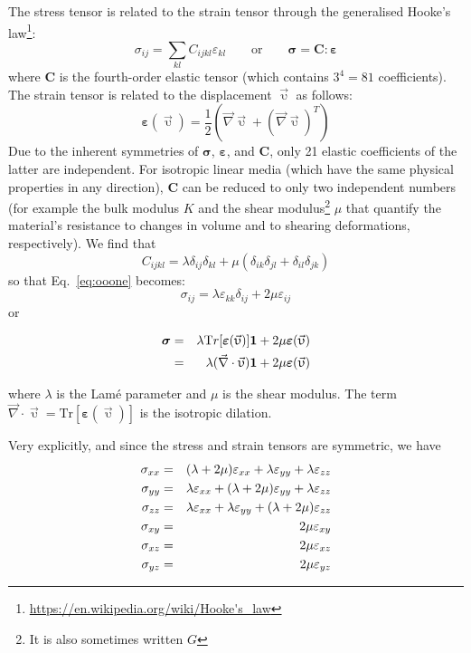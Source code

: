 The stress tensor is related to the strain tensor through the generalised 
Hooke's law\footnote{\url{https://en.wikipedia.org/wiki/Hooke's_law}}:
\begin{equation}
\sigma_{ij}=\sum_{kl}C_{ijkl}\varepsilon_{kl} 
\qquad
\text{or}
\qquad
{\bm \sigma} = {\bm C} : {\bm \varepsilon}
\label{eq:ooone}
\end{equation}
where ${\bm C}$ is the fourth-order elastic tensor (which contains $3^4=81$ coefficients).
The strain tensor is related to the displacement $\vec{\upupsilon}$ as follows: 
\begin{equation}
{\bm \varepsilon}(\vec{\upupsilon}) 
= \frac{1}{2}(\vec{\nabla}\vec{\upupsilon} + (\vec{\nabla}\vec{\upupsilon})^T)
\end{equation}
Due to the inherent symmetries of ${\bm \sigma}$, ${\bm \varepsilon}$, and ${\bm C}$, 
only 21 elastic coefficients of the latter are independent. For isotropic linear media (which have the same physical properties in any direction), ${\bm C}$ can be reduced to only two independent numbers (for example the bulk modulus $K$ and the shear modulus\footnote{It is also sometimes written $G$} $\mu$ that quantify the material's resistance to changes in volume and to shearing deformations, respectively).
We find that
\[
C_{ijkl} = \lambda \delta_{ij}\delta_{kl} + \mu (\delta_{ik}\delta_{jl}+\delta_{il}\delta_{jk})
\]
so that Eq.~\eqref{eq:ooone} becomes:
\[
\sigma_{ij}=\lambda \varepsilon_{kk} \delta_{ij} + 2\mu \varepsilon_{ij}
\]
or
\begin{mdframed}[backgroundcolor=blue!5]
\begin{eqnarray}
{\bm \sigma}
&=&\lambda {\text Tr}[{\bm \varepsilon}(\vec{\upupsilon})] {\bm 1} 
+2\mu {\bm \varepsilon}(\vec{\upupsilon})
\nonumber\\
&=&\lambda (\vec{\nabla}\cdot\vec{\upupsilon}) {\bm 1} +2\mu {\bm \varepsilon}(\vec{\upupsilon}) 
\label{eq:twooELAST}
\end{eqnarray}
\end{mdframed}
where $\lambda$ is the Lam\'e parameter and $\mu$ is the shear modulus. The term $\vec{\nabla}\cdot\vec{\upupsilon}=\text{Tr}[{\bm \varepsilon}(\vec{\upupsilon})]$ is the isotropic dilation.

Very explicitly, and since the stress and strain tensors are symmetric, we have
\begin{eqnarray}
\sigma_{xx} &=& (\lambda+2\mu)  \varepsilon_{xx} + \lambda \varepsilon_{yy} + \lambda \varepsilon_{zz} \nonumber\\
\sigma_{yy} &=& \lambda \varepsilon_{xx} + (\lambda+2\mu)  {\varepsilon}_{yy} + \lambda \varepsilon_{zz}\nonumber\\
\sigma_{zz} &=& \lambda \varepsilon_{xx} + \lambda \varepsilon_{yy} + (\lambda+2\mu)  {\varepsilon}_{zz} \nonumber\\
\sigma_{xy} &=& 2\mu  {\varepsilon}_{xy} \nonumber\\
\sigma_{xz} &=& 2\mu  {\varepsilon}_{xz} \nonumber\\
\sigma_{yz} &=& 2\mu  {\varepsilon}_{yz} 
\end{eqnarray}



